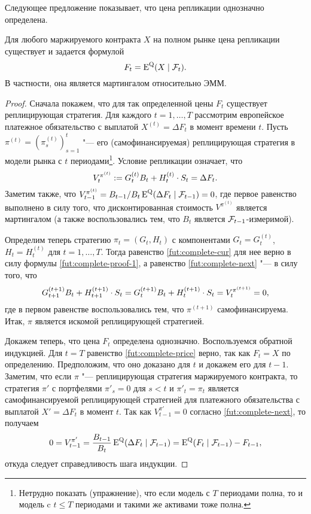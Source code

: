Следующее предложение показывает, что цена репликации однозначно определена.

\begin{proposition}
Для любого маржируемого контракта $X$ на полном рынке цена репликации существует и задается формулой 
\begin{equation}
\label{fut:complete-price}
F_t = \operatorname{E}^{\mathrm{Q}}(X\mid \mathcal{F}_t).
\end{equation}
В частности, она является мартингалом относительно ЭММ.
\end{proposition}

\begin{proof}
Сначала покажем, что для так определенной цены $F_t$ существует реплицирующая стратегия.
Для каждого $t=1,\dots,T$ рассмотрим европейское платежное обязательство с выплатой $X^{(t)}=\Delta F_{t}$ в момент времени $t$.
Пусть $\pi^{(t)}=(\pi^{(t)}_s)_{s=1}^{t}$ "--- его (самофинансируемая) реплицирующая стратегия в модели рынка с $t$ периодами\footnote{Нетрудно показать (упражнение), что если модель с $T$ периодами полна, то и модель c $t\le T$ периодами и такими же активами тоже полна.}.
Условие репликации означает, что 
\begin{equation}
\label{fut:complete-proof-1}
V_t^{\pi^{(t)}} := G_t^{(t)}B_t + {H_t^{(t)}}\cdot{S_t} = \Delta F_t.
\end{equation}
Заметим также, что $V_{t-1}^{\pi^{(t)}} = B_{t-1}/B_t \operatorname{E}^{\mathrm{Q}}(\Delta F_t\mid\mathcal{F}_{t-1}) = 0$, где первое равенство выполнено в силу того, что дисконтированная стоимость $V^{\pi^{(t)}}$ является мартингалом (а также воспользовались тем, что $B_t$ является $\mathcal{F}_{t-1}$-измеримой).

Определим теперь стратегию $\pi_t = (G_t, H_t)$ с компонентами $G_t= G_t^{(t)}$, $H_t=H_t^{(t)}$ для $t=1,\dots,T$.
Тогда равенство \eqref{fut:complete-cur} для нее верно в силу формулы \eqref{fut:complete-proof-1}, а равенство \eqref{fut:complete-next} "--- в силу того, что 
\[
G_{t+1}^{(t+1)} B_t + {H_{t+1}^{(t+1)}}\cdot{S_t}
= G_{t}^{(t+1)} B_t + {H_{t}^{(t+1)}}\cdot{S_t}
= V_t^{\pi^{(t+1)}} = 0,
\]
где в первом равенстве воспользовались тем, что $\pi^{(t+1)}$ самофинансируема.
Итак, $\pi$ является искомой реплицирующей стратегией.

Докажем теперь, что цена $F_t$ определена однозначно.
Воспользуемся обратной индукцией.
Для $t=T$ равенство \eqref{fut:complete-price} верно, так как $F_t=X$ по определению. 
Предположим, что оно доказано для $t$ и докажем его для $t-1$.
Заметим, что если $\pi$ "--- реплицирующая стратегия маржируемого контракта, то стратегия $\pi'$ с портфелями $\pi'_s=0$ для $s< t$ и $\pi'_t=\pi_t$ является самофинансируемой реплицирующей стратегией для платежного обязательства с выплатой $X' = \Delta F_t$ в момент $t$.
Так как $V_{t-1}^{\pi'} = 0$ согласно \eqref{fut:complete-next}, то получаем
\[
0 = V_{t-1}^{\pi'} = \frac{B_{t-1}}{B_t} \operatorname{E}^{\mathrm{Q}}(\Delta F_t\mid \mathcal{F}_{t-1})
= \operatorname{E}^{\mathrm{Q}}(F_t\mid \mathcal{F}_{t-1}) - F_{t-1},
\]
откуда следует справедливость шага индукции.


\end{proof}
